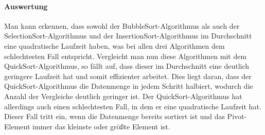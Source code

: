 \documentclass[./entry.tex]{subfiles}
\begin{document}
    \paragraph{Auswertung}
    Man kann erkennen, dass sowohl der BubbleSort-Algorithmus als auch der SelectionSort-Algorithmus
    und der InsertionSort-Algorithmus im Durchschnitt eine quadratische Laufzeit haben, was bei allen
    drei Algorithmen dem schlechtesten Fall entspricht.
    Vergleicht man nun diese Algorithmen mit dem QuickSort-Algorithmus, so fällt auf, dass dieser
    im Durchschnitt eine deutlich geringere Laufzeit hat und somit effizienter arbeitet.
    Dies liegt daran, dass der QuickSort-Algorithmus die Datenmenge in jedem Schritt halbiert,
    wodurch die Anzahl der Vergleiche deutlich geringer ist.
    Der QuickSort-Algorithmus hat allerdings auch einen schlechtesten Fall, in dem er eine quadratische Laufzeit hat.
    Dieser Fall tritt ein, wenn die Datenmenge bereits sortiert ist und das Pivot-Element immer das kleinste oder größte Element ist.
\end{document}
